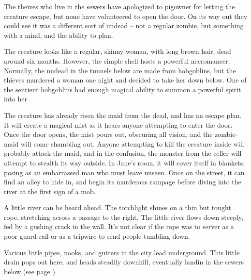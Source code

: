 The theives who live in the sewers have apologized to \gls{pigowner} for letting the creature escape, but none have volunteered to open the door.  On its way out they could see it was a different sort of undead -- not a regular zombie, but something with a mind, and the ability to plan.

The creature looks like a regular, skinny woman, with long brown hair, dead around six months.  However, the simple shell hosts a powerful necromancer.  Normally, the undead in the tunnels below are made from hobgoblins, but the thieves murdered a woman one night and decided to take her down below.  One of the sentient hobgoblins had enough magical ability to summon a powerful spirit into her.

The creature has already risen the maid from the dead, and has an escape plan.  It will create a magical mist as it hears anyone attempting to enter the door.  Once the door opens, the mist pours out, obscuring all vision, and the zombie-maid will come shambling out.  Anyone attempting to kill the creature inside will probably attack the maid, and in the confusion, the monster from the celler will attempt to stealth its way outside.  In Jane's room, it will cover itself in blankets, posing as an embarrassed man who must leave unseen.  Once on the street, it can find an alley to hide in, and begin its murderous rampage before diving into the river at the first sign of a mob.






\begin{boxtext}
	A little river can be heard ahead.  The torchlight shines on a thin but tought rope, stretching across a passage to the right.  The little river flows down steeply, fed by a gushing crack in the wall.  It's not clear if the rope was to server as a poor guard-rail or as a tripwire to send people tumbling down.
\end{boxtext}

Various little pipes, nooks, and gutters in the city lead underground.  This little drain pops out here, and heads steadily downhill, eventually landin in the sewers below (see page \pageref{slidein}).

